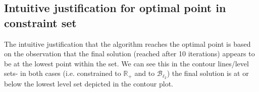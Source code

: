 \documentclass[paper=a4, fontsize=11pt]{scrartcl} %
\numberwithin{equation}{section} %
\numberwithin{figure}{section} %
\numberwithin{table}{section} %
\begin{document}
\subsection{Intuitive justification for optimal point in constraint set}

The intuitive justification that the algorithm reaches the optimal point is based on the observation that the final solution (reached after 10 iterations) appears to be at the lowest point within the set. We can see this in the contour lines/level sets- in both cases (i.e. constrained to $\mathbb{R}_+$ and to $\mathcal{B}_{\ell_2}$) the final solution is at or below the lowest level set  depicted in the contour plot.
\end{document}
